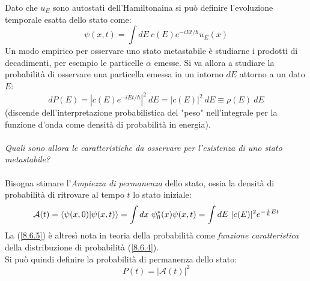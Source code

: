 \documentclass[twoside]{article}
\begin{document}
Dato che $u_E$ sono autostati dell'Hamiltonaina si può definire l'evoluzione temporale esatta dello stato come:
\begin{equation}
    \psi(x,t)=\int dE \ c(E) e^{-iEt/\hbar}u_E(x)
\end{equation}
Un modo empirico per osservare uno stato metastabile è studiarne i prodotti di decadimenti, per esempio le particelle $\alpha$ emesse.
Si va allora a studiare la probabilità di osservare una particella emessa in un intorno $dE$ attorno a un dato $E$:
\begin{equation} \label{8.6.4}
    dP(E)=|c(E)e^{-iEt/\hbar}|^2 \ dE = |c(E)|^2 \ dE \equiv \rho(E) \ dE
\end{equation}
(discende dell'interpretazione probabilistica del "peso" nell'integrale per la funzione d'onda come densità di probabilità in energia).
\\ \\
\textit{Quali sono allora le caratteristiche da osservare per l'esistenza di uno stato metastabile?}
\\ \\
Bisogna stimare l'\textit{Ampiezza di permanenza} dello stato, ossia la densità di probabilità di ritrovare al tempo $t$ lo stato iniziale:
\begin{equation} \label{8.6.5}
    \mathcal{A}(t)=\bra{\psi(x,0)}\ket{\psi(x,t)}=\int dx \ \psi_0 ^* (x) \psi(x,t) = \int dE \ |c(E)|^2 e^{-\frac{i}{\hbar}Et}
\end{equation}
La (\ref{8.6.5}) è altresì nota in teoria della probabilità come \textit{funzione caratteristica} della distribuzione di probabilità (\ref{8.6.4}).
\\
Si può quindi definire la probabilità di permanenza dello stato:
\begin{equation}
    P(t)=|\mathcal{A}(t)|^2
\end{equation}
\end{document}
